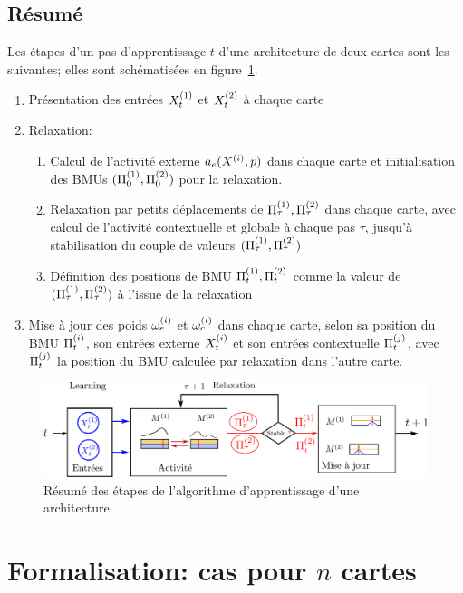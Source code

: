 \documentclass[../main]{subfiles}
\begin{document}
\subsection{Résumé}
Les étapes d'un pas d'apprentissage $t$ d'une architecture de deux cartes sont les suivantes; elles sont schématisées en figure~\ref{fig:algo}.
\begin{enumerate}
\item Présentation des entrées $X^{({1})}_t$ et $X^{({2})}_t$ à chaque carte
\item Relaxation:
\begin{enumerate}
\item Calcul de l'activité externe $a_e(X^{({i})},p)$ dans chaque carte et initialisation des BMUs $(\Pi^{({1})}_0,\Pi^{({2})}_0)$ pour la relaxation.
\item Relaxation par petits déplacements de $\Pi^{({1})}_\tau,\Pi^{({2})}_\tau$ dans chaque carte, avec calcul de l'activité contextuelle et globale à chaque pas $\tau$, jusqu'à stabilisation du couple de valeurs $(\Pi^{({1})}_\tau,\Pi^{({2})}_\tau)$
\item Définition des positions de BMU $\Pi^{({1})}_t,\Pi^{({2})}_t$ comme la valeur de $(\Pi^{({1})}_\tau,\Pi^{({2})}_\tau)$ à l'issue de la relaxation
\end{enumerate}
\item Mise à jour des poids $\omega_{e}^{({i})}$ et $\omega_{c}^{({i})}$ dans chaque carte, selon sa position du BMU $\Pi^{({i})}_t$, son entrées externe $X^{({i})}_t$ et son entrées contextuelle $\Pi^{({j})}_t$, avec $\Pi^{({j})}_t$ la position du BMU calculée par relaxation dans l'autre carte.
\end{enumerate}
\begin{figure}
\centering
\includegraphics[width=\textwidth]{learning_tests_2maps}
\caption{Résumé des étapes de l'algorithme d'apprentissage d'une architecture.}
\label{fig:algo}
\end{figure}


\section{Formalisation: cas pour $n$ cartes}\label{sec:formalisme}
\end{document}
